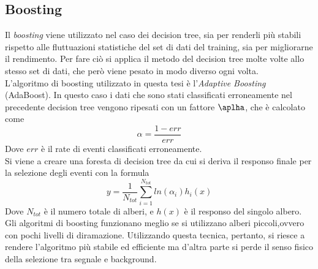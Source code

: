    \subsection{Boosting}
    Il \textit{boosting} viene utilizzato nel caso dei decision tree, sia per renderli più stabili rispetto alle fluttuazioni statistiche del set di dati del training, sia per migliorarne il rendimento. Per fare ciò si applica il metodo del decision tree molte volte allo stesso set di dati, che però viene pesato in modo diverso ogni volta. 
    \\L'algoritmo di boosting utilizzato in questa tesi è l'\textit{Adaptive Boosting} (AdaBoost). In questo caso i dati che sono stati classificati erroneamente nel precedente decision tree vengono ripesati con un fattore $\aplha$, che è calcolato come 
        \begin{equation}
            \alpha = \frac{1 - err}{err}
        \end{equation}
    Dove $err$ è il rate di eventi classificati erroneamente. 
    \\Si viene a creare una foresta di decision tree da cui si deriva il responso finale per la selezione degli eventi con la formula 
        \begin{equation}
            y = \frac{1}{N_{tot}} \sum_{i=1}^{N_{tot}} {ln(\alpha_i) h_i(x)}
        \end{equation}
    Dove $N_{tot}$ è il numero totale di alberi, e $h(x)$ è il responso del singolo albero.
    Gli algoritmi di boosting funzionano meglio se si utilizzano alberi piccoli,ovvero con pochi livelli di diramazione.
    Utilizzando questa tecnica, pertanto, si riesce a rendere l'algoritmo più stabile ed efficiente ma d'altra parte si perde il senso fisico della selezione tra segnale e background.%
    
    
    
    
